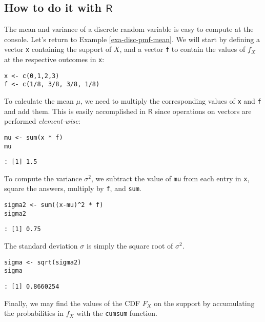 \subsection{How to do it with \(\mathsf{R}\)}
\label{sec-5-1-2-1}

The mean and variance of a discrete random variable is easy to compute
at the console. Let's return to Example \ref{exa-disc-pmf-mean}. We will start
by defining a vector \texttt{x} containing the support of \(X\), and a vector
\texttt{f} to contain the values of \(f_{X}\) at the respective outcomes in
\texttt{x}:

\begin{Verbatim}
x <- c(0,1,2,3)
f <- c(1/8, 3/8, 3/8, 1/8)
\end{Verbatim}

To calculate the mean \(\mu\), we need to multiply the corresponding
values of \texttt{x} and \texttt{f} and add them. This is easily accomplished in
\(\mathsf{R}\) since operations on vectors are performed
\emph{element-wise}:

\begin{Verbatim}
mu <- sum(x * f)
mu
\end{Verbatim}

\begin{verbatim}
: [1] 1.5
\end{verbatim}

To compute the variance \(\sigma^{2}\), we subtract the value of \texttt{mu}
from each entry in \texttt{x}, square the answers, multiply by \texttt{f}, and
\texttt{sum}.

\begin{Verbatim}
sigma2 <- sum((x-mu)^2 * f)
sigma2
\end{Verbatim}

\begin{verbatim}
: [1] 0.75
\end{verbatim}

The standard deviation \(\sigma\) is simply the square root of \(\sigma^{2}\).

\begin{Verbatim}
sigma <- sqrt(sigma2)
sigma
\end{Verbatim}

\begin{verbatim}
: [1] 0.8660254
\end{verbatim}

Finally, we may find the values of the CDF \(F_{X}\) on the support by
accumulating the probabilities in \(f_{X}\) with the \texttt{cumsum}
function.

